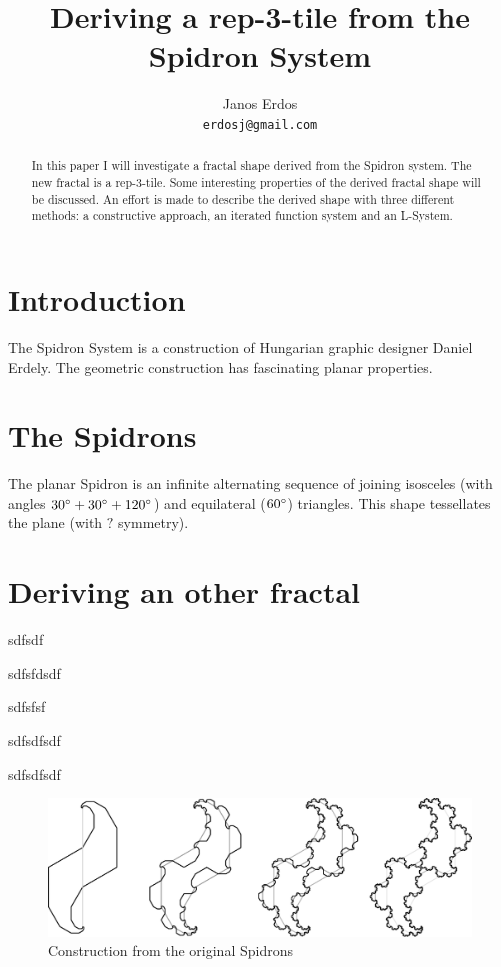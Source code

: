 \documentclass[11pt]{article}
\title{Deriving a rep-3-tile from the Spidron System}
\author{ Janos Erdos \\ {\tt erdosj@gmail.com}}
\date{}				%
\begin{document}
 \maketitle \thispagestyle{empty}

\begin{abstract}

In this paper I will investigate a fractal shape derived from the Spidron system. The new fractal is  a rep-3-tile. 
Some interesting properties of the derived fractal shape will be discussed. An effort is made to describe
the derived shape with three different methods: a constructive approach, an iterated function system and an L-System.

\end{abstract}

\section*{Introduction}

The Spidron System is a construction of Hungarian graphic designer Daniel Erdely. The geometric construction
has fascinating planar properties.

\section*{The Spidrons}

\noindent The planar Spidron is an infinite alternating sequence of joining isosceles (with angles $30\degree + 30\degree + 120\degree$) and equilateral ($60\degree$) triangles. This shape tessellates the plane (with $?$ symmetry). 

\section*{Deriving an other fractal}

\noindent sdfsdf

\noindent sdfsfdsdf

\noindent sdfsfsf

\noindent sdfsdfsdf

\noindent sdfsdfsdf

\begin{figure}[h!tbp]
	\begin{center}
	\includegraphics[width=5in]{figures/construction-steps}
	\end{center}
	\caption{Construction from the original Spidrons}
	\label{FigSample}
\end{figure}
\end{document}
